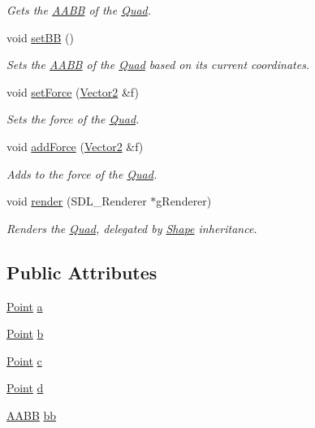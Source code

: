 \begin{DoxyCompactItemize}
\begin{DoxyCompactList}\small\item\em Gets the \mbox{\hyperlink{class_a_a_b_b}{A\+A\+BB}} of the \mbox{\hyperlink{class_quad}{Quad}}. \end{DoxyCompactList}\item 
void \mbox{\hyperlink{class_quad_a8707911fc752adad20b07a9a77f4ba0e}{set\+BB}} ()
\begin{DoxyCompactList}\small\item\em Sets the \mbox{\hyperlink{class_a_a_b_b}{A\+A\+BB}} of the \mbox{\hyperlink{class_quad}{Quad}} based on its current coordinates. \end{DoxyCompactList}\item 
void \mbox{\hyperlink{class_quad_a9adb3dc8ea14c8d1f5bf7492c5ba18f7}{set\+Force}} (\mbox{\hyperlink{struct_vector2}{Vector2}} \&f)
\begin{DoxyCompactList}\small\item\em Sets the force of the \mbox{\hyperlink{class_quad}{Quad}}. \end{DoxyCompactList}\item 
void \mbox{\hyperlink{class_quad_a1f0a30842d8b35a8402baa8bb76384ad}{add\+Force}} (\mbox{\hyperlink{struct_vector2}{Vector2}} \&f)
\begin{DoxyCompactList}\small\item\em Adds to the force of the \mbox{\hyperlink{class_quad}{Quad}}. \end{DoxyCompactList}\item 
void \mbox{\hyperlink{class_quad_abc8023f3883c6fe4391e24418a4258ab}{render}} (S\+D\+L\+\_\+\+Renderer $\ast$g\+Renderer)
\begin{DoxyCompactList}\small\item\em Renders the \mbox{\hyperlink{class_quad}{Quad}}, delegated by \mbox{\hyperlink{class_shape}{Shape}} inheritance. \end{DoxyCompactList}\end{DoxyCompactItemize}
\subsection*{Public Attributes}
\begin{DoxyCompactItemize}
\item 
\mbox{\hyperlink{class_point}{Point}} \mbox{\hyperlink{class_quad_a6d2e2a508ba54fd2c0d286850d2fc99f}{a}}
\item 
\mbox{\hyperlink{class_point}{Point}} \mbox{\hyperlink{class_quad_a429f3bf619a9e29f56e03c701001d508}{b}}
\item 
\mbox{\hyperlink{class_point}{Point}} \mbox{\hyperlink{class_quad_a90ece951ddbf1c23049a912e26068680}{c}}
\item 
\mbox{\hyperlink{class_point}{Point}} \mbox{\hyperlink{class_quad_ac1855601f7ffc0f7d77f06ee60d541d6}{d}}
\item 
\mbox{\hyperlink{class_a_a_b_b}{A\+A\+BB}} \mbox{\hyperlink{class_quad_a2f4674ea8313163f9ff4a7cbe707fae3}{bb}}
\end{DoxyCompactItemize}


